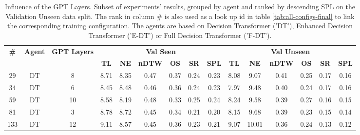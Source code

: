 \begin{table}
\centering
\caption{\label{tab:layers}Influence of the GPT Layers. Subset of experiments' results, grouped by agent and ranked by descending SPL on the Validation Unseen data split. The rank in column \# is also used as a look up id in table \ref{tab:all-configs-final} to link the corresponding training configuration.     \newline The agents are based on Decision Transformer ('DT'), Enhanced Decision Transformer ('E-DT') or Full Decision Transformer ('F-DT').}
\begin{tabular}{@{\hskip3pt}c@{\hskip3pt}c@{\hskip3pt}c@{\hskip3pt}c@{\hskip3pt}c@{\hskip3pt}c@{\hskip3pt}c@{\hskip3pt}c@{\hskip3pt}c@{\hskip3pt}c@{\hskip3pt}c@{\hskip3pt}c@{\hskip3pt}c@{\hskip3pt}c@{\hskip3pt}c}
\toprule
\textbf{\#} & \textbf{Agent} & \textbf{GPT Layers} & \multicolumn{6}{c}{\textbf{Val Seen}} & \multicolumn{6}{c}{\textbf{Val Unseen}} \\
 \cmidrule(l){4-9} \cmidrule(l){10-15} \textbf{~} &     \textbf{~} &          \textbf{~} &       \textbf{TL} & \textbf{NE} & \textbf{nDTW} & \textbf{OS} & \textbf{SR} & \textbf{SPL} &         \textbf{TL} & \textbf{NE} & \textbf{nDTW} & \textbf{OS} & \textbf{SR} & \textbf{SPL} \\
\midrule
         29 &             DT &                   8 &              8.71 &        8.35 &          0.47 &        0.37 &        0.24 &         0.23 &                8.08 &        9.07 &          0.41 &        0.25 &        0.17 &         0.16 \\
         34 &             DT &                   6 &              8.45 &        8.48 &          0.46 &        0.36 &        0.24 &         0.23 &                7.97 &        9.48 &          0.40 &        0.24 &        0.17 &         0.16 \\
         59 &             DT &                  10 &              8.58 &        8.19 &          0.48 &        0.33 &        0.25 &         0.24 &                8.24 &        9.58 &          0.39 &        0.27 &        0.16 &         0.15 \\
         81 &             DT &                   3 &              8.78 &        8.72 &          0.45 &        0.34 &        0.21 &         0.20 &                8.15 &        9.68 &          0.39 &        0.23 &        0.15 &         0.14 \\
        133 &             DT &                  12 &              9.11 &        8.57 &          0.45 &        0.36 &        0.23 &         0.21 &                9.07 &       10.01 &          0.36 &        0.24 &        0.13 &         0.12 \\

\end{tabular}
\end{table}
